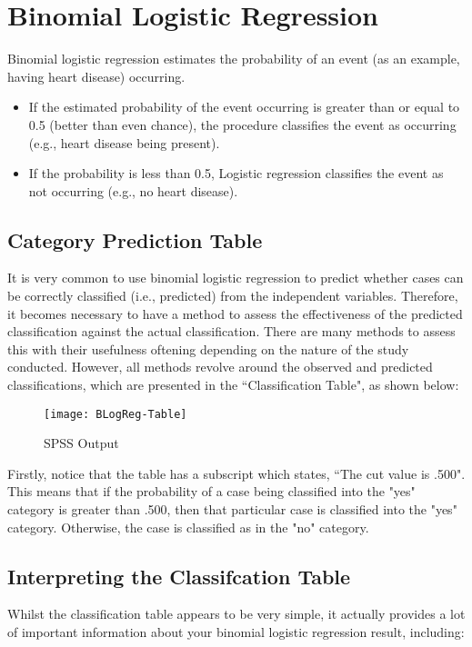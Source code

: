 \documentclass[12pt]{article}
\begin{document}
\tableofcontents
\newpage
\section{Binomial Logistic Regression}
Binomial logistic regression estimates the probability of an event (as an example, having heart disease) occurring. 
\begin{itemize}
\item If the estimated probability of the event occurring is greater than or equal to 0.5 (better than even chance), the procedure classifies the event as occurring (e.g., heart disease being present). \item If the probability is less than 0.5, Logistic regression classifies the event as not occurring (e.g., no heart disease). 
\end{itemize}
\subsection{Category Prediction Table}




It is very common to use binomial logistic regression to predict whether cases can be correctly classified (i.e., predicted) from the independent variables. Therefore, it becomes necessary to have a method to assess the effectiveness of the predicted classification against the actual classification. There are many methods to assess this with their usefulness oftening depending on the nature of the study conducted. However, all methods revolve around the observed and predicted classifications, which are presented in the ``Classification Table", as shown below:

\begin{figure}[h!]
\centering
\texttt{[image: BLogReg-Table]}
\caption{SPSS Output}
\label{fig:BLogReg-Table}
\end{figure}

Firstly, notice that the table has a subscript which states, ``The cut value is .500". This means that if the probability of a case being classified into the "yes" category is greater than .500, then that particular case is classified into the "yes" category. 
Otherwise, the case is classified as in the "no" category. 

\subsection{Interpreting the Classifcation Table}
Whilst the classification table appears to be very simple, it actually provides a lot of important information about your binomial logistic regression result, including:
\end{document}
